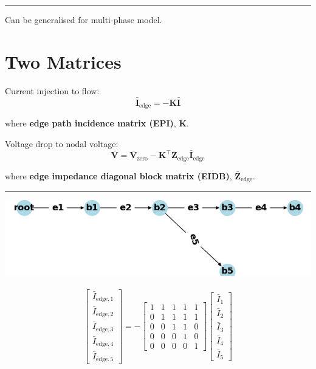 \documentclass[
]{book}
\begin{document}
\begin{center}\rule{0.5\linewidth}{0.5pt}\end{center}

Can be generalised for multi-phase model. \citep{hsieh2017matrix}

\hypertarget{matrices}{%
\section{Two Matrices}\label{matrices}}

Current injection to flow:
\[
  \bar{\boldsymbol{I}}_{\text{edge}} =
  - \boldsymbol{K} \bar{\boldsymbol{I}}
\]

where \textbf{edge path incidence matrix (EPI)}, \(\boldsymbol{K}\).

Voltage drop to nodal voltage:
\[
  \bar{\boldsymbol{V}} =
  \bar{\boldsymbol{V}}_{\text{zero}}
  - \boldsymbol{K}^{\top} \boldsymbol{\bar{Z}}_\text{edge}
  \bar{\boldsymbol{I}}_{\text{edge}} 
\]

where \textbf{edge impedance diagonal block matrix (EIDB)},
\(\boldsymbol{\bar{Z}}_\text{edge}\).

\begin{center}\rule{0.5\linewidth}{0.5pt}\end{center}

\begin{center}\includegraphics[width=0.7\linewidth]{Pictures/figCaseSix} \end{center}

\[ \begin{aligned}
    \left[\begin{array}{l}
    \bar{I}_{\text{edge}, 1} \\
    \bar{I}_{\text{edge}, 2} \\
    \bar{I}_{\text{edge}, 3} \\
    \bar{I}_{\text{edge}, 4} \\
    \bar{I}_{\text{edge}, 5}
    \end{array}\right]
    = - \left[\begin{array}{lllll}
    1 & 1 & 1 & 1 & 1 \\
    0 & 1 & 1 & 1 & 1 \\
    0 & 0 & 1 & 1 & 0 \\
    0 & 0 & 0 & 1 & 0 \\
    0 & 0 & 0 & 0 & 1
    \end{array}\right]
    \left[\begin{array}{l}
    \bar{I}_{1} \\
    \bar{I}_{2} \\
    \bar{I}_{3} \\
    \bar{I}_{4} \\
    \bar{I}_{5}
    \end{array}\right]
\end{aligned} \]
\end{document}

